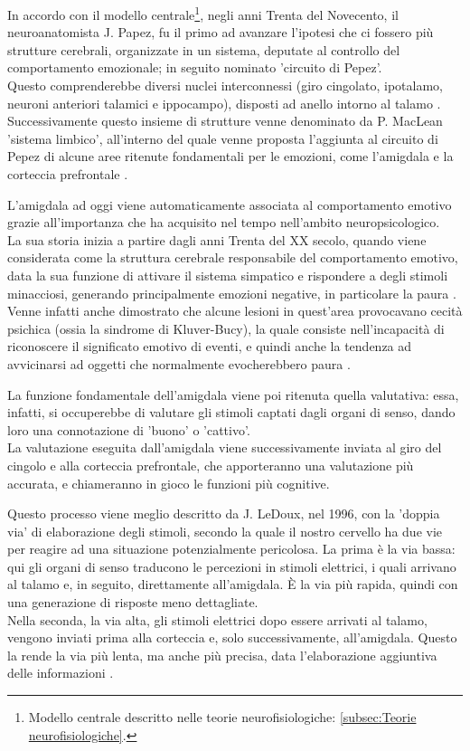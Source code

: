 In accordo con il modello centrale\footnote{Modello centrale descritto nelle teorie neurofisiologiche: \autoref{subsec:Teorie neurofisiologiche}.}, negli anni Trenta del Novecento, il neuroanatomista J. Papez, fu il primo ad avanzare l’ipotesi che ci fossero più strutture cerebrali, organizzate in un sistema, deputate al controllo del comportamento emozionale; in seguito nominato 'circuito di Pepez'.\\
Questo comprenderebbe diversi nuclei interconnessi (giro cingolato, ipotalamo, neuroni anteriori talamici e ippocampo), disposti ad anello intorno al talamo \parencite{papez}.\\
Successivamente questo insieme di strutture venne denominato da P. MacLean 'sistema limbico', all'interno del quale venne proposta l'aggiunta al circuito di Pepez di alcune aree ritenute fondamentali per le emozioni, come l'amigdala e la corteccia prefrontale \parencite{maclean}. 

L'amigdala ad oggi viene automaticamente associata al comportamento emotivo grazie all'importanza che ha acquisito nel tempo nell'ambito neuropsicologico.\\
La sua storia inizia a partire dagli anni Trenta del XX secolo, quando viene considerata come la struttura cerebrale responsabile del comportamento emotivo, data la sua funzione di attivare il sistema simpatico e rispondere a degli stimoli minacciosi, generando principalmente emozioni negative, in particolare la paura \parencite{goleman}.\\ 
Venne infatti anche dimostrato che alcune lesioni in quest'area provocavano cecità psichica (ossia la sindrome di Kluver-Bucy), la quale consiste nell’incapacità di riconoscere il significato emotivo di eventi, e quindi anche la tendenza ad avvicinarsi ad oggetti che normalmente evocherebbero paura \parencite{psicobiologia}.

La funzione fondamentale dell'amigdala viene poi ritenuta quella valutativa: essa, infatti, si occuperebbe di valutare gli stimoli captati dagli organi di senso, dando loro una connotazione di 'buono' o 'cattivo'.\\
La valutazione eseguita dall'amigdala viene successivamente inviata al giro del cingolo e alla corteccia prefrontale, che apporteranno una valutazione più accurata, e chiameranno in gioco le funzioni più cognitive.

Questo processo viene meglio descritto da J. LeDoux, nel 1996, con la 'doppia via' di elaborazione degli stimoli, secondo la quale il nostro cervello ha due vie per reagire ad una situazione potenzialmente pericolosa.
La prima è la via bassa: qui gli organi di senso traducono le percezioni in stimoli elettrici, i quali arrivano al talamo e, in seguito, direttamente all'amigdala. È la via più rapida, quindi con una generazione di risposte meno dettagliate.\\
Nella seconda, la via alta, gli stimoli elettrici dopo essere arrivati al talamo, vengono inviati prima alla corteccia e, solo successivamente, all'amigdala. Questo la rende la via più lenta, ma anche più precisa, data l'elaborazione aggiuntiva delle informazioni \parencite{ledoux}.

